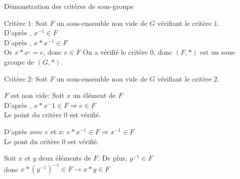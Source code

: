 \documentclass[12pt,twoside,a4paper]{article}
\begin{document}
			\begin{preuve}
				D\'emonstration des crit\`eres de sous-groupe
				\begin{liste}
					\item Crit\`ere $1$: Soit $F$ un sous-ensemble non vide de $G$ v\'erifiant le crit\`ere $1$.\\
					D'apr\`es , $x^{-1}\in F$\\
					D'apr\`es , $x*x^{-1}\in F$\\
					Or $x*x^{_1}=e$, donc $e\in F$
					On a v\'erifi\'e le crit\`ere $0$, donc $(F,*)$ est un sous-groupe de $(G,*)$.
					\item Crit\`ere $2$: Soit $F$ un sous-ensemble non vide de $G$ v\'erifiant le crit\`ere $2$.\\
					\begin{liste}
						\item $F$ est non vide: Soit $x$ un \'el\'ement de $F$\\
						D'apr\`es , $x*x^-1\in F\Rightarrow e\in F$\\
						Le point  du crit\`ere $0$ est v\'erifi\'e.
						\item D'apr\`es  avec $e$ et $x$: $e*x^{-1}\in F\Rightarrow x^{-1}\in F$\\
						Le pont  du crit\`ere $0$ est v\'erifi\'e.
						\item Soit $x$ et $y$ deux \'el\'ements de $F$. De plus, $y^{-1}\in F$\\
						donc $x*\left(y^{-1}\right)^{-1}\in F\rightarrow x*y\in F$
					\end{liste}
				\end{liste}
			\end{preuve}
\end{document}
